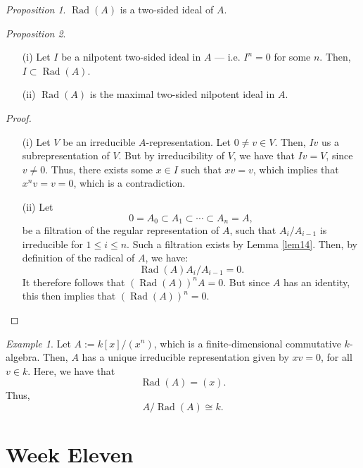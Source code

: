 \documentclass[a4paper]{report}
\theoremstyle{definition}
\theoremstyle{remark}
\theoremstyle{proposition}
\newtheorem{proposition}{Proposition}
\theoremstyle{conjecture}
\theoremstyle{lemma}
\theoremstyle{corollary}
\theoremstyle{exercise}
\theoremstyle{example}
\newtheorem{example}{Example}
\newcommand{\on}{\operatorname}
\begin{document}
\begin{proposition}
    $\on{Rad}(A)$ is a two-sided ideal of $A$.
\end{proposition}

\begin{proposition}
    \leavevmode
    \begin{itemize}
        \item[(i)] Let $I$ be a nilpotent two-sided ideal in $A$ --- 
            i.e. $I^n = 0$ for some $n$. Then, $I\subset \on{Rad}(A)$.
        \item[(ii)] $\on{Rad}(A)$ is the maximal two-sided nilpotent ideal
            in $A$.
    \end{itemize}
\end{proposition}

\begin{proof}
    \leavevmode
    \begin{itemize}
        \item[(i)] Let $V$ be an irreducible $A$-representation. 
            Let $0\neq v\in V$. Then, $Iv$ us a subrepresentation of 
            $V$. But by irreducibility of $V$, we have that 
            $Iv = V$, since $v\neq 0$.
            Thus, there exists some $x\in I$ such that $xv=v$, which implies
            that $x^nv = v = 0$, which is a contradiction.
        \item[(ii)] Let 
            $$0 = A_0 \subset A_1 \subset \cdots \subset A_n = A,$$
            be a filtration of the regular representation of $A$, 
            such that $A_i/A_{i-1}$ is irreducible for $1\leq i \leq n$.
            Such a filtration exists by Lemma \ref{lem14}.
            Then, by definition of the radical of $A$, we have:
            $$\on{Rad}(A)A_i/A_{i-1} = 0.$$
            It therefore follows that $\left(\on{Rad}(A)\right)^nA = 0$.
            But since $A$ has an identity, this then implies that 
            $\left(\on{Rad}(A)\right)^n = 0$.
    \end{itemize}
\end{proof}

\begin{example}
    Let $A := k[x]/(x^n)$, which is a finite-dimensional commutative 
    $k$-algebra. Then, $A$ has a unique irreducible representation
    given by $xv = 0$, for all $v\in k$.
    Here, we have that 
    $$\on{Rad}(A) = (x).$$
    Thus, $$A/\on{Rad}(A) \cong k.$$
\end{example}

\chapter{Week Eleven}
\end{document}
